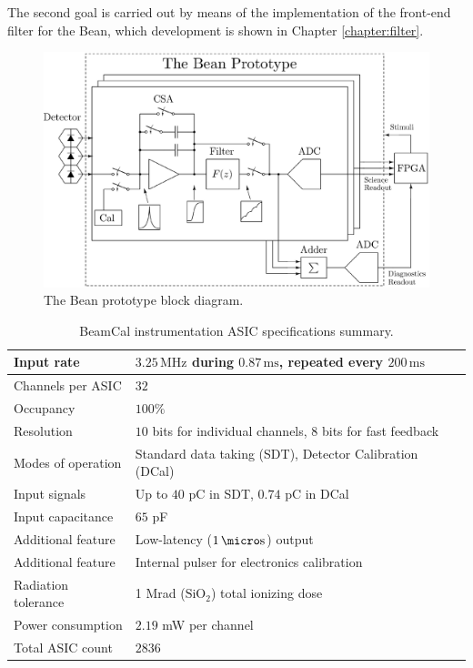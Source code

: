 The second goal is carried out by means of the implementation of the front-end filter for the Bean, which development is shown in Chapter \ref{chapter:filter}.

\begin{figure}[!t]
	\centering
	\includegraphics[width=5.3in]{./Figures/thebean_diag.eps}
	\caption{The Bean prototype block diagram.}\label{fig:bean_diag}
\end{figure}

\begin{table}[!t]
	\begin{center}
		\begin{tabular}{|l|l|}\hline
			Input rate & $3.25\,\text{MHz}$ during $0.87\,\text{ms}$, repeated every $200\,\text{ms}$ \\ \hline
			Channels per ASIC & $32$ \\ \hline
			Occupancy & $100\%$ \\ \hline
			Resolution & $10$ bits for individual channels, $8$ bits for fast feedback \\ \hline
			Modes of operation & Standard data taking (SDT), Detector Calibration (DCal) \\ \hline
			Input signals & Up to $40$ pC in SDT, $0.74$ pC in DCal \\ \hline
			Input capacitance & $65$ pF \\ \hline
			Additional feature & Low-latency ($1\,\micro\text{s}$) output \\ \hline
			Additional feature & Internal pulser for electronics calibration \\ \hline
			Radiation tolerance & 1 Mrad ($\text{SiO}_2$) total ionizing dose \\ \hline
			Power consumption & $2.19$ mW per channel \\ \hline
			Total ASIC count & $2836$ \\\hline
		\end{tabular}
		\vspace*{5pt}
		\caption{BeamCal instrumentation ASIC specifications summary.}\label{tab:bean_specs}
	\end{center}
\end{table}

